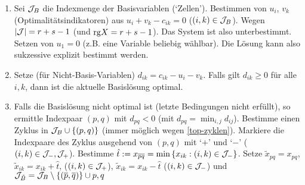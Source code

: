     \begin{enumerate}
            \item Sei $\mathcal{J}_B$ die Indexmenge der Basisvariablen (`Zellen'). Bestimmen von $u_i$, $v_k$ (Optimalitätsindikatoren) aus $u_i+v_k-c_{ik}=0$ ($(i,k)\in \mathcal{J}_B$).
        Wegen $\left\vert{\mathcal{J}}\right\vert=r+s-1$ (und $\mathrm{rg} X=r+s-1$). Das System ist also unterbestimmt.
        Setzen von $u_1=0$ (z.B. eine Variable beliebig wählbar). Die Lösung kann also sukzessive explizit bestimmt werden.
            \item Setze (für Nicht-Basis-Variablen) $d_{ik}=c_{ik}-u_i-v_k$. Falls gilt $d_{ik}\geq 0$ für alle $i,k$, dann ist die aktuelle Basislösung optimal.
        \item Falls die Basislösung nicht optimal ist (letzte Bedingungen nicht erfüllt), so ermittle Indexpaar $(p,q)$ mit $d_{pq}<0$ (mit $d_{pq}=\min_{i,j}{d_{ij}}$). Bestimme einen Zyklus in $\cJ_B\setjoin\set{(p,q)}$ (immer möglich wegen \autoref{top-zyklen}). Markiere die Indexpaare des Zyklus ausgehend von $(p,q)$ mit `$+$' und `$-$' ($(i,k)\in\mathcal{J}_-,\mathcal{J}_+$). Bestimme $\hat t:= x_{\bar p \bar q}=\min\set{x_{ik}:(i,k)\in\cJ_-}$. Setze $\tilde x_{pq}=x_{pq}$, $\tilde x_{ik}=x_{ik}+\hat t$, ($(i,k)\in\mathcal{J}_+$), $\tilde x_{ik} = x_{ik}-\hat t$ ($(i,k)\in \mathcal{J}_-$) und $\cJ_{\tilde B}=\cJ_B\setminus\set{(\bar p,\bar q)}\setjoin{p,q}$
    \end{enumerate}
